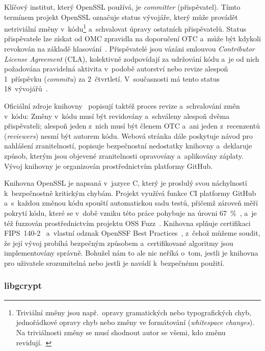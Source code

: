 Klíčový institut, který OpenSSL používá, je \textit{committer} (přispěvatel). Tímto termínem projekt OpenSSL označuje status vývojáře, který může provádět netriviální změny v~kódu\footnote{Triviální změny jsou např.\ opravy gramatických nebo typografických chyb, jednořádkové opravy chyb nebo změny ve formátování (\emph{whitespace changes}). Na triviálnosti změny se musí shodnout autor se všemi, kdo změnu revidují.~\cite{openssl-committerpolicy}} a~schvalovat úpravy ostatních přispěvatelů. Status přispěvatele lze získat od OMC zpravidla na doporučení OTC a~může být kdykoli revokován na základě hlasování~\cite{openssl-committerpolicy}. Přispěvatelé jsou vázáni smlouvou \textit{Contributor License Agreement} (CLA), kolektivně zodpovídají za udržování kódu a~je od nich požadována pravidelná aktivita v~podobě autorství nebo revize alespoň 1~příspěvku (\textit{commitu}) za 2~čtvrtletí. V~současnosti má tento status 18~vývojářů~\cite{openssl-committerlist}.

Oficiální zdroje knihovny~\cite{openssl-committerpolicy} popisují taktéž proces revize a~schvalování změn v~kódu: Změny v~kódu musí být revidovány a~schváleny alespoň dvěma přispěvateli; alespoň jeden z~nich musí být členem OTC a~ani jeden z~recenzentů (\textit{reviewers}) nesmí být autorem kódu. Webová stránka dále poskytuje návod pro nahlášení zranitelností, popisuje bezpečnostní nedostatky knihovny a~deklaruje způsob, kterým jsou objevené zranitelnosti opravovány a~aplikovány záplaty. Vývoj knihovny je organizován prostřednictvím platformy GitHub.

Knihovna OpenSSL je napsaná v~jazyce C, který je proslulý svou náchylností k~bezpečnostně kritickým chybám. Projekt využívá funkce CI platformy GitHub a~s~každou změnou kódu spouští automatickou sadu testů, přičemž zároveň měří pokrytí kódu, které se v~době vzniku této práce pohybuje na úrovni 67~\%~\cite{openssl-codecov}, a~je též fuzzován prostřednictvím projektu OSS Fuzz~\cite{openssl-fuzz}. Knihovna splňuje certifikaci FIPS~140-2~\cite{openssl-fips} a~vlastní odznak OpenSSF Best Practices~\cite{openssl-openssf}, z~čehož můžeme soudit, že její vývoj probíhá bezpečným způsobem a~certifikované algoritmy jsou implementovány správně. Bohužel nám to ale nic neříká o~tom, jestli je knihovna pro uživatele srozumitelná nebo jestli je navádí k~bezpečnému použití.

\subsubsection*{libgcrypt}

